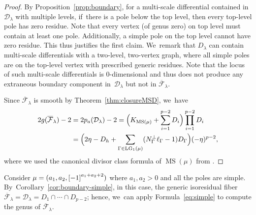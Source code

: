 \documentclass[11pt]{article}
\DeclareMathOperator\LG{LG}
\DeclareMathOperator\MS{MS}
\theoremstyle{definition}
\begin{document}
\begin{proof}
By Proposition~\ref{prop:boundary}, for a multi-scale differential contained in $\mathcal D_\lambda$ with multiple levels, if~there is a pole below the top level, then every top-level pole has zero residue. Note that every vertex (of genus zero) on top level must contain at least one pole. Additionally, a simple pole on the top level cannot have zero residue. This thus justifies the first claim. We~remark that $D_\lambda$ can contain multi-scale differentials with a two-level, two-vertex graph, where all simple poles are on the top-level vertex with prescribed generic residues. Note that the locus of such multi-scale differentials is $0$\nobreakdash-dimensional and thus does not produce any extraneous boundary component in~$\mathcal D_\lambda$ but not in $\overline{\mathcal F}_\lambda$.

Since $\overline{\mathcal F}_\lambda$ is smooth by Theorem~\ref{thm:closureMSD}, we~have\vspace*{-5pt}
\begin{equation}
\begin{aligned}
2g(\overline{\mathcal F}_\lambda) - 2 & = 2p_a (\mathcal D_\lambda) - 2  = \Bigl(K_{\MS(\mu)} + \sum_{i=1}^{p-2}D_i\Bigr) \prod_{i=1}^{p-2} D_i \\
& = \Bigl( 2\eta - D_h + \sum_{\Gamma\in \LG_1(\mu)} (N_{\Gamma}^{\bot} \ell_\Gamma - 1) D_\Gamma \Bigr)(-\eta)^{p-2},
\end{aligned}
\end{equation}
where we used the canonical divisor class formula of $\MS(\mu)$ from \cite[Th.\,1.1]{CMZ}.
\end{proof}

Consider $\mu = (a_1, a_2, \rec[-1][a_1+a_2+2])$ where $a_1, a_2 > 0$ and all the poles are simple. By~Corollary~\ref{cor:boundary-simple}, in this case, the generic isoresidual fiber $\overline{\mathcal F}_\lambda = \mathcal D_\lambda = D_1\cap \cdots \cap D_{p-2}$; hence, we~can apply Formula~\eqref{eq:simple} to compute the genus of $\overline{\mathcal F}_\lambda$.
\end{document}
